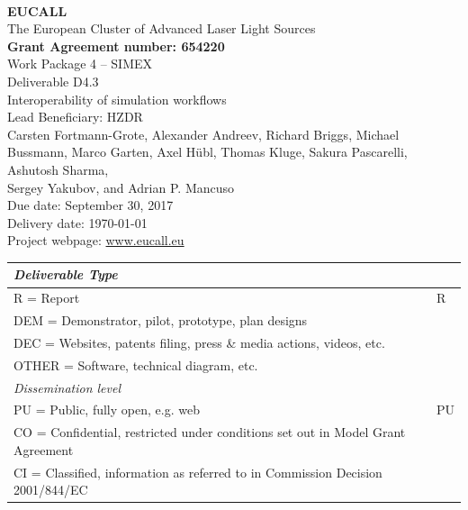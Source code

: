 \documentclass[10pt]{scrartcl}
\begin{document}
\makeatletter
\begin{titlepage}
\thispagestyle{scrheadings}
\begin{center}
$~$\\
\vspace{0cm}
{\Large\textbf{EUCALL}\\[2ex]
The European Cluster of Advanced Laser Light Sources}\\[4ex]
%
{\small\textbf{Grant Agreement number: 654220}}\\[8ex]
%
Work Package 4 -- SIMEX\\[4ex]
%
Deliverable D4.3\\
%
Interoperability of simulation workflows\\[5ex]
%
Lead Beneficiary: HZDR\\[5ex]
%
Carsten Fortmann-Grote,
Alexander Andreev,
Richard Briggs,
Michael Bussmann,
Marco Garten,
Axel H\"ubl,
Thomas Kluge,
Sakura Pascarelli,
Ashutosh Sharma,\\
Sergey Yakubov,
and
Adrian P. Mancuso\\[4ex]
%
Due date: September 30, 2017\\
Delivery date: \today \\[4ex]
%
Project webpage: \url{www.eucall.eu}\\[6ex]
%
{%
\small
\begin{tabular}{|l|l|}
  \hline
  \multicolumn{2}{|l|}{ \textit{Deliverable Type} } \\
  \hline
  R = Report\hfill & R \\
  DEM = Demonstrator, pilot, prototype, plan designs & \\
  DEC = Websites, patents filing, press \& media actions, videos, etc. & \\
  OTHER = Software, technical diagram, etc. & \\
  \hline
  \multicolumn{2}{|l|}{\textit{Dissemination level}} \\
  \hline
  PU = Public, fully open, e.g. web & PU \\
  CO = Confidential, restricted under conditions set out in Model Grant
  Agreement\hspace*{17ex}\  & \\
  CI = Classified, information as referred to in Commission Decision 2001/844/EC
  & \\
  \hline
\end{tabular}
}

\end{center}
%
{}
\normalfont
\end{titlepage}
\makeatother
%
\tableofcontents
%
\newpage
%
\end{document}
